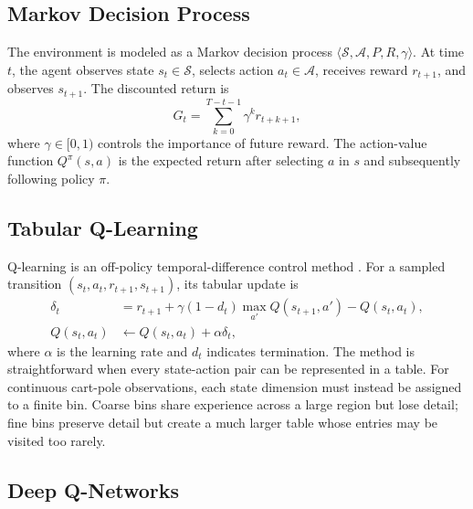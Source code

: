 \documentclass[conference]{IEEEtran}
\begin{document}
\subsection{Markov Decision Process}

The environment is modeled as a Markov decision process
$\langle\mathcal{S},\mathcal{A},P,R,\gamma\rangle$. At time $t$, the agent
observes state $s_t\in\mathcal{S}$, selects action
$a_t\in\mathcal{A}$, receives reward $r_{t+1}$, and observes $s_{t+1}$.
The discounted return is
\begin{equation}
G_t=\sum_{k=0}^{T-t-1}\gamma^k r_{t+k+1},
\end{equation}
where $\gamma\in[0,1)$ controls the importance of future reward. The
action-value function $Q^\pi(s,a)$ is the expected return after selecting
$a$ in $s$ and subsequently following policy $\pi$.

\subsection{Tabular Q-Learning}

Q-learning is an off-policy temporal-difference control method
\cite{watkins1992qlearning}. For a sampled transition
$(s_t,a_t,r_{t+1},s_{t+1})$, its tabular update is
\begin{equation}
\begin{split}
\delta_t &= r_{t+1}+\gamma(1-d_t)
            \max_{a'}Q(s_{t+1},a')-Q(s_t,a_t),\\
Q(s_t,a_t)&\leftarrow Q(s_t,a_t)+\alpha\delta_t,
\end{split}
\label{eq:qlearning}
\end{equation}
where $\alpha$ is the learning rate and $d_t$ indicates termination. The
method is straightforward when every state-action pair can be represented in
a table. For continuous cart-pole observations, each state dimension must
instead be assigned to a finite bin. Coarse bins share experience across a
large region but lose detail; fine bins preserve detail but create a much
larger table whose entries may be visited too rarely.

\subsection{Deep Q-Networks}
\end{document}
